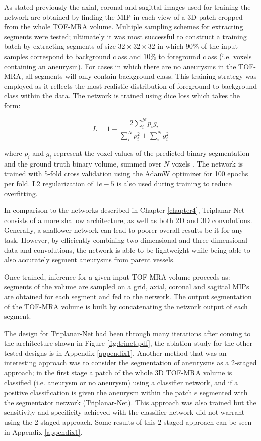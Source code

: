 As stated previously the axial, coronal and sagittal images used for training the network are obtained by finding the MIP in each view of a 3D patch cropped from the whole TOF-MRA volume. Multiple sampling schemes for extracting segments were tested; ultimately it was most successful to construct a training batch by extracting segments of size $32 \times 32 \times 32$ in which $90\%$ of the input samples correspond to background class and $10\%$ to foreground class (i.e. voxels containing an aneurysm). For cases in which there are no aneurysms in the TOF-MRA, all segments will only contain background class. This training strategy was employed as it reflects the most realistic distribution of foreground to background class within the data. The network is trained using dice loss which takes the form: 

\[L = 1 - \frac{2\sum_{i}^{N}p_{i}g_{i}}{\sum_{i}^{N}p_{i}^{2} + \sum_{i}^{N}g_{i}^{2}} \]

where $p_{i}$ and $g_{i}$ represent the voxel values of the predicted binary segmentation and the ground truth binary volume, summed over $N$ voxels \cite{milletari2016v}. The network is trained with 5-fold cross validation using the AdamW optimizer for 100 epochs per fold. L2 regularization of $1e-5$ is also used during training to reduce overfitting.

In comparison to the networks described in Chapter \ref{chapter4}, Triplanar-Net consists of a more shallow architecture, as well as both 2D and 3D convolutions. Generally, a shallower network can lead to poorer overall results be it for any task. However, by efficiently combining two dimensional and three dimensional data and convolutions, the network is able to be lightweight while being able to also accurately segment aneurysms from parent vessels.

Once trained, inference for a given input TOF-MRA volume proceeds as: segments of the volume are sampled on a grid, axial, coronal and sagittal MIPs are obtained for each segment and fed to the network. The output segmentation of the TOF-MRA volume is built by concatenating the network output of each segment.

The design for Triplanar-Net had been through many iterations after coming to the architecture shown in Figure \ref{fig:trinet.pdf}, the ablation study for the other tested designs is in Appendix \ref{appendix1}. Another method that was an interesting approach was to consider the segmentation of aneurysms as a 2-staged approach; in the first stage a patch of the whole 3D TOF-MRA volume is classified (i.e. aneurysm or no aneurysm) using a classifier network, and if a positive classification is given the aneurysm within the patch s segmented with the segmentator network (Triplanar-Net). This approach was also trained but the sensitivity and specificity achieved with the classifier network did not warrant using the 2-staged approach. Some results of this 2-staged approach can be seen in Appendix \ref{appendix1}.

